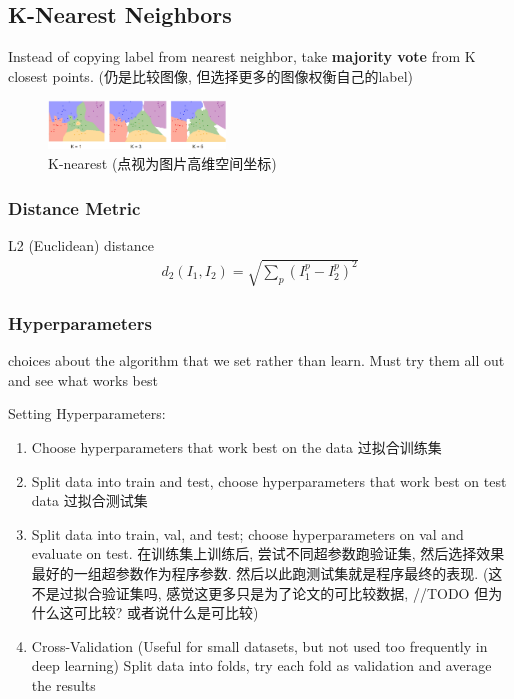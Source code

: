 \subsection{K-Nearest Neighbors}
Instead of copying label from nearest neighbor, take \textbf{majority vote} from K closest points. (仍是比较图像, 但选择更多的图像权衡自己的label)

\begin{figure}[!htb]
    \centering
    \includegraphics[width=0.42\textwidth]{pic/Lec2/K-nearest}
    \caption{K-nearest (点视为图片高维空间坐标)}
\end{figure}

\subsubsection{Distance Metric}
L2 (Euclidean) distance
\begin{align*}
    d_2(I_1, I_2)=\sqrt{\sum_p(I_1^p-I_2^p)^2}
\end{align*}

\subsubsection{Hyperparameters}
choices about the algorithm that we set rather than learn. Must try them all out and see what works best

Setting Hyperparameters: 
\begin{enumerate}
    \item Choose hyperparameters that work best on the data 过拟合训练集
    \item Split data into train and test, choose hyperparameters that work best on test data 过拟合测试集
    \item Split data into train, val, and test; choose hyperparameters on val and evaluate on test. 在训练集上训练后, 尝试不同超参数跑验证集, 然后选择效果最好的一组超参数作为程序参数. 然后以此跑测试集就是程序最终的表现. (这不是过拟合验证集吗, 感觉这更多只是为了论文的可比较数据, //TODO  但为什么这可比较? 或者说什么是可比较) 
    \item Cross-Validation (Useful for small datasets, but not used too frequently in deep learning) Split data into folds, try each fold as validation and average the results
\end{enumerate}


